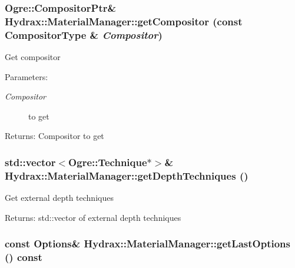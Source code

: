 \begin{CompactItemize}
{\subsubsection[{getCompositor}]{\setlength{\rightskip}{0pt plus 5cm}Ogre::CompositorPtr\& Hydrax::MaterialManager::getCompositor (const {\bf CompositorType} \& {\em Compositor})}}
\label{class_hydrax_1_1_material_manager_e72ebb13cf760e473c8fdad10410fcc7}


Get compositor \begin{Desc}
\item[Parameters:]
\begin{description}
\item[{\em Compositor}]to get \end{description}
\end{Desc}
\begin{Desc}
\item[Returns:]Compositor to get \end{Desc}
\hypertarget{class_hydrax_1_1_material_manager_964a29c17a27037791f2b1c76bdf2aea}{
\subsubsection[{getDepthTechniques}]{\setlength{\rightskip}{0pt plus 5cm}std::vector$<$Ogre::Technique$\ast$$>$\& Hydrax::MaterialManager::getDepthTechniques ()}}
\label{class_hydrax_1_1_material_manager_964a29c17a27037791f2b1c76bdf2aea}


Get external depth techniques \begin{Desc}
\item[Returns:]std::vector of external depth techniques \end{Desc}
\hypertarget{class_hydrax_1_1_material_manager_3237e8772cce892c16501aa910639b07}{
\subsubsection[{getLastOptions}]{\setlength{\rightskip}{0pt plus 5cm}const {\bf Options}\& Hydrax::MaterialManager::getLastOptions () const}}
\label{class_hydrax_1_1_material_manager_3237e8772cce892c16501aa910639b07}



\end{CompactItemize}
